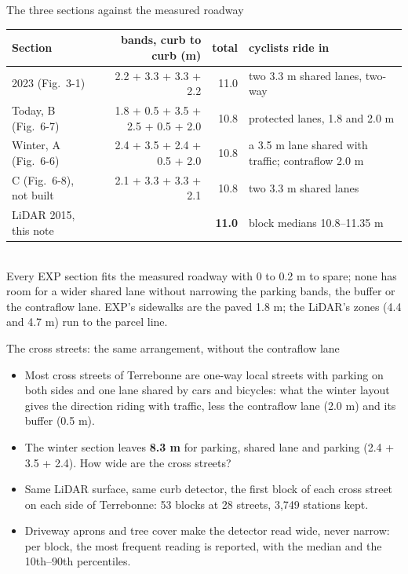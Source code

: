 \documentclass[aspectratio=169,11pt]{beamer}\usetheme{default}\usecolortheme{seahorse}\setbeamertemplate{navigation symbols}{}\setbeamertemplate{footline}[frame number]
\begin{document}
\begin{frame}{The three sections against the measured roadway}\centering\scriptsize\begin{tabular}{lrrl}\toprule Section & bands, curb to curb (m) & total & cyclists ride in\\ \midrule
2023 (Fig.~3-1) & 2.2 + 3.3 + 3.3 + 2.2 & 11.0 & two 3.3 m shared lanes, two-way\\
Today, B (Fig.~6-7) & 1.8 + 0.5 + 3.5 + 2.5 + 0.5 + 2.0 & 10.8 & protected lanes, 1.8 and 2.0 m\\
Winter, A (Fig.~6-6) & 2.4 + 3.5 + 2.4 + 0.5 + 2.0 & 10.8 & a 3.5 m lane shared with traffic; contraflow 2.0 m\\
C (Fig.~6-8), not built & 2.1 + 3.3 + 3.3 + 2.1 & 10.8 & two 3.3 m shared lanes\\
\midrule LiDAR 2015, this note & & \textbf{11.0} & block medians 10.8--11.35 m\\ \bottomrule\end{tabular}\\[8pt]{\small Every EXP section fits the measured roadway with 0 to 0.2 m to spare; none has room for a wider shared lane without narrowing the parking bands, the buffer or the contraflow lane. EXP\textquoteright{}s sidewalks are the paved 1.8 m; the LiDAR\textquoteright{}s zones (4.4 and 4.7 m) run to the parcel line.}\end{frame}
\begin{frame}{The cross streets: the same arrangement, without the contraflow lane}\begin{itemize}
\item Most cross streets of Terrebonne are one-way local streets with parking on both sides and one lane shared by cars and bicycles: what the winter layout gives the direction riding with traffic, less the contraflow lane (2.0 m) and its buffer (0.5 m).
\item The winter section leaves \textbf{8.3 m} for parking, shared lane and parking (2.4 + 3.5 + 2.4). How wide are the cross streets?
\item Same LiDAR surface, same curb detector, the first block of each cross street on each side of Terrebonne: 53 blocks at 28 streets, 3,749 stations kept.
\item Driveway aprons and tree cover make the detector read wide, never narrow: per block, the most frequent reading is reported, with the median and the 10th--90th percentiles.
\end{itemize}\end{frame}
\end{document}
